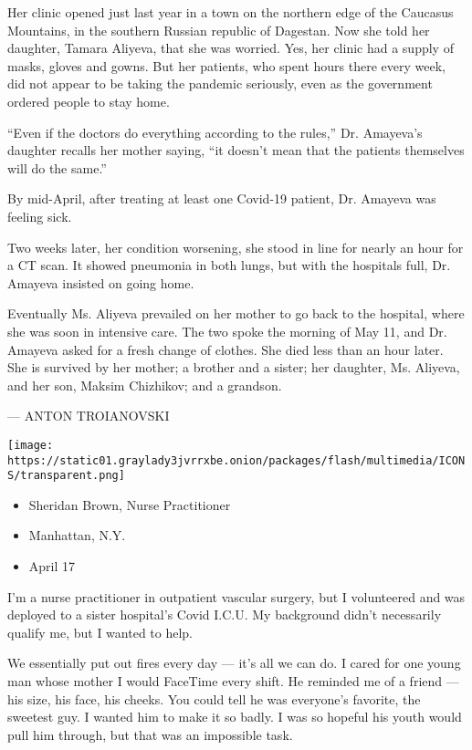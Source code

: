 Her clinic opened just last year in a town on the northern edge of the
Caucasus Mountains, in the southern Russian republic of Dagestan. Now
she told her daughter, Tamara Aliyeva, that she was worried. Yes, her
clinic had a supply of masks, gloves and gowns. But her patients, who
spent hours there every week, did not appear to be taking the pandemic
seriously, even as the government ordered people to stay home.

``Even if the doctors do everything according to the rules,'' Dr.
Amayeva's daughter recalls her mother saying, ``it doesn't mean that the
patients themselves will do the same.''

By mid-April, after treating at least one Covid-19 patient, Dr. Amayeva
was feeling sick.

Two weeks later, her condition worsening, she stood in line for nearly
an hour for a CT scan. It showed pneumonia in both lungs, but with the
hospitals full, Dr. Amayeva insisted on going home.

Eventually Ms. Aliyeva prevailed on her mother to go back to the
hospital, where she was soon in intensive care. The two spoke the
morning of May 11, and Dr. Amayeva asked for a fresh change of clothes.
She died less than an hour later. She is survived by her mother; a
brother and a sister; her daughter, Ms. Aliyeva, and her son, Maksim
Chizhikov; and a grandson.

--- ANTON TROIANOVSKI

\texttt{[image: https://static01.graylady3jvrrxbe.onion/packages/flash/multimedia/ICONS/transparent.png]}

\begin{itemize}
\tightlist
\item
  Sheridan Brown, Nurse Practitioner
\item
  Manhattan, N.Y.
\item
  April 17
\end{itemize}

I'm a nurse practitioner in outpatient vascular surgery, but I
volunteered and was deployed to a sister hospital's Covid I.C.U. My
background didn't necessarily qualify me, but I wanted to help.

We essentially put out fires every day --- it's all we can do. I cared
for one young man whose mother I would FaceTime every shift. He reminded
me of a friend --- his size, his face, his cheeks. You could tell he was
everyone's favorite, the sweetest guy. I wanted him to make it so badly.
I was so hopeful his youth would pull him through, but that was an
impossible task.

